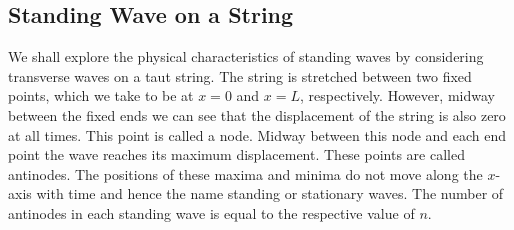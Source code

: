 \documentclass[../../../main.tex]{subfiles}
\begin{document}
\subsection*{Standing Wave on a String}
We shall explore the physical characteristics of standing waves by considering transverse waves on a taut string. The string is stretched between two fixed points, which we take to be at $x = 0$ and $x = L$, respectively. However, midway between the fixed ends we can see that the displacement of the string is also zero at all times. This point is called a node. Midway between this node and each end point the wave reaches its maximum displacement. These points are called antinodes. The positions of these maxima and minima do not move along the $x$-axis with time and hence the name standing or stationary waves. The number of antinodes in each standing wave is equal to the respective value of $n$.
\begin{figure*}[h]
    \centering
\end{figure*}
\end{document}
